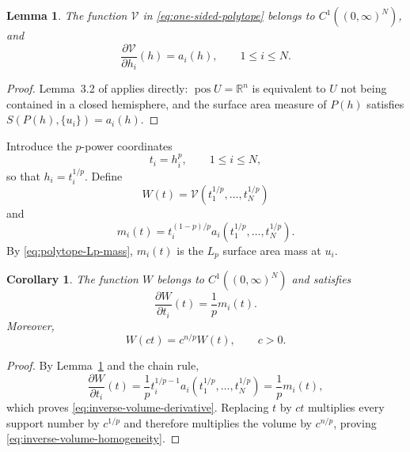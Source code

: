 \documentclass[12pt,reqno]{amsart}
\numberwithin{equation}{section}
\newtheorem{lemma}[theorem]{Lemma}
\newtheorem{corollary}[theorem]{Corollary}
\theoremstyle{remark}
\DeclareMathOperator{\pos}{pos}
\newcommand{\R}{\mathbb R}
\begin{document}
\begin{lemma}\label{lem:one-sided-volume-C1}
	The function \(\mathcal V\) in
	\eqref{eq:one-sided-polytope} belongs to
	\(C^1((0,\infty)^N)\), and
	\begin{equation}\label{eq:one-sided-volume-derivative}
		\frac{\partial\mathcal V}{\partial h_i}(h)=a_i(h),
		\qquad 1\leq i\leq N.
	\end{equation}
\end{lemma}

\begin{proof}
	Lemma~3.2 of \cite{HugLutwakYangZhang} applies directly:
	\(\pos U=\R^n\) is equivalent to \(U\) not being contained in a
	closed hemisphere, and the surface area measure of \(P(h)\) satisfies
	\(S(P(h),\{u_i\})=a_i(h)\).
\end{proof}





Introduce the \(p\)-power coordinates
\begin{equation}\label{eq:inverse-support-variables}
 t_i=h_i^p,
 \qquad 1\leq i\leq N,
\end{equation}
so that $h_i=t_i^{1/p}$. Define
\begin{equation}
 W(t)=\mathcal V(t_1^{1/p},\ldots,t_N^{1/p})
\end{equation}
and
\begin{equation}\label{eq:one-sided-mass}
 m_i(t)=t_i^{(1-p)/p}
 a_i(t_1^{1/p},\ldots,t_N^{1/p}).
\end{equation}
By \eqref{eq:polytope-Lp-mass}, $m_i(t)$ is the $L_p$ surface area mass at $u_i$.

\begin{corollary}\label{cor:inverse-volume-derivative}
The function $W$ belongs to $C^1((0,\infty)^N)$ and satisfies
\begin{equation}\label{eq:inverse-volume-derivative}
 \frac{\partial W}{\partial t_i}(t)=\frac1p m_i(t).
\end{equation}
Moreover,
\begin{equation}\label{eq:inverse-volume-homogeneity}
 W(ct)=c^{n/p}W(t),
 \qquad c>0.
\end{equation}
\end{corollary}

\begin{proof}
By Lemma~\ref{lem:one-sided-volume-C1} and the chain rule,
\[
 \frac{\partial W}{\partial t_i}(t)
 =\frac1p t_i^{1/p-1}
 a_i(t_1^{1/p},\ldots,t_N^{1/p})
 =\frac1p m_i(t),
\]
which proves \eqref{eq:inverse-volume-derivative}. Replacing $t$ by $ct$ multiplies every support number by $c^{1/p}$ and therefore multiplies the volume by $c^{n/p}$, proving \eqref{eq:inverse-volume-homogeneity}.
\end{proof}
\end{document}
